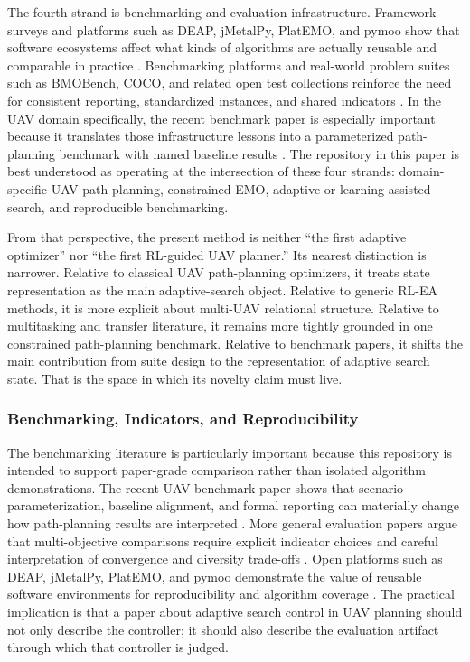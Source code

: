 \documentclass[a4paper,fleqn]{cas-dc}
\begin{document}
The fourth strand is benchmarking and evaluation infrastructure. Framework surveys and platforms such as DEAP, jMetalPy, PlatEMO, and pymoo show that software ecosystems affect what kinds of algorithms are actually reusable and comparable in practice \cite{ref6,ref44,ref45}. Benchmarking platforms and real-world problem suites such as BMOBench, COCO, and related open test collections reinforce the need for consistent reporting, standardized instances, and shared indicators \cite{ref49,ref50}. In the UAV domain specifically, the recent benchmark paper is especially important because it translates those infrastructure lessons into a parameterized path-planning benchmark with named baseline results \cite{ref10}. The repository in this paper is best understood as operating at the intersection of these four strands: domain-specific UAV path planning, constrained EMO, adaptive or learning-assisted search, and reproducible benchmarking.

From that perspective, the present method is neither ``the first adaptive optimizer'' nor ``the first RL-guided UAV planner.'' Its nearest distinction is narrower. Relative to classical UAV path-planning optimizers, it treats state representation as the main adaptive-search object. Relative to generic RL-EA methods, it is more explicit about multi-UAV relational structure. Relative to multitasking and transfer literature, it remains more tightly grounded in one constrained path-planning benchmark. Relative to benchmark papers, it shifts the main contribution from suite design to the representation of adaptive search state. That is the space in which its novelty claim must live.

\subsubsection{Benchmarking, Indicators, and Reproducibility}

The benchmarking literature is particularly important because this repository is intended to support paper-grade comparison rather than isolated algorithm demonstrations. The recent UAV benchmark paper shows that scenario parameterization, baseline alignment, and formal reporting can materially change how path-planning results are interpreted \cite{ref10}. More general evaluation papers argue that multi-objective comparisons require explicit indicator choices and careful interpretation of convergence and diversity trade-offs \cite{ref49,ref50}. Open platforms such as DEAP, jMetalPy, PlatEMO, and pymoo demonstrate the value of reusable software environments for reproducibility and algorithm coverage \cite{ref44,ref45}. The practical implication is that a paper about adaptive search control in UAV planning should not only describe the controller; it should also describe the evaluation artifact through which that controller is judged.
\end{document}
